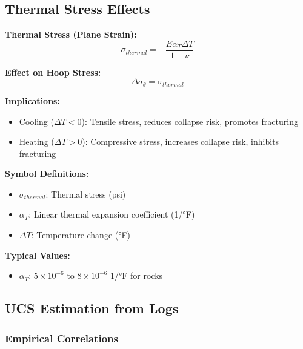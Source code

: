 \documentclass[11pt,a4paper]{article}
\newcommand{\symitem}[2]{\item \textbf{#1}: #2}
\begin{document}
\subsection{Thermal Stress Effects}

\begin{tcolorbox}[colback=formulabox,colframe=black!75]
\textbf{Thermal Stress (Plane Strain):}
\begin{equation}
\sigma_{thermal} = -\frac{E \alpha_T \Delta T}{1-\nu}
\end{equation}

\textbf{Effect on Hoop Stress:}
\begin{equation}
\Delta\sigma_\theta = \sigma_{thermal}
\end{equation}

\textbf{Implications:}
\begin{itemize}
\item Cooling ($\Delta T < 0$): Tensile stress, reduces collapse risk, promotes fracturing
\item Heating ($\Delta T > 0$): Compressive stress, increases collapse risk, inhibits fracturing
\end{itemize}
\end{tcolorbox}

\textbf{Symbol Definitions:}
\begin{itemize}[leftmargin=2cm]
\symitem{$\sigma_{thermal}$}{Thermal stress (psi)}
\symitem{$\alpha_T$}{Linear thermal expansion coefficient (1/°F)}
\symitem{$\Delta T$}{Temperature change (°F)}
\end{itemize}

\textbf{Typical Values:}
\begin{itemize}
\item $\alpha_T$: $5 \times 10^{-6}$ to $8 \times 10^{-6}$ 1/°F for rocks
\end{itemize}

\subsection{UCS Estimation from Logs}

\subsubsection{Empirical Correlations}
\end{document}
